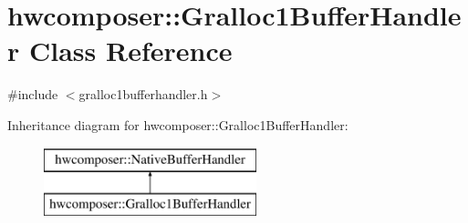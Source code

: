 \hypertarget{classhwcomposer_1_1Gralloc1BufferHandler}{}\section{hwcomposer\+:\+:Gralloc1Buffer\+Handler Class Reference}
\label{classhwcomposer_1_1Gralloc1BufferHandler}


{\ttfamily \#include $<$gralloc1bufferhandler.\+h$>$}

Inheritance diagram for hwcomposer\+:\+:Gralloc1Buffer\+Handler\+:\begin{figure}[H]
\begin{center}
\leavevmode
\includegraphics[height=2.000000cm]{classhwcomposer_1_1Gralloc1BufferHandler}
\end{center}
\end{figure}
